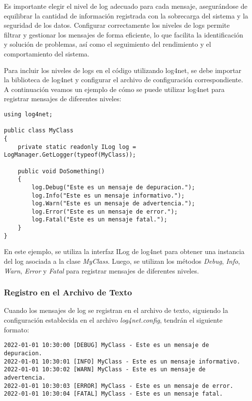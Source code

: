\documentclass[executivepaper]{article}
\begin{document}
Es importante elegir el nivel de log adecuado para cada mensaje, asegurándose de equilibrar la cantidad de información registrada con la sobrecarga del sistema y la seguridad de los datos. Configurar correctamente los niveles de logs permite filtrar y gestionar los mensajes de forma eficiente, lo que facilita la identificación y solución de problemas, así como el seguimiento del rendimiento y el comportamiento del sistema.

Para incluir los niveles de logs en el código utilizando log4net, se debe importar la biblioteca de log4net y configurar el archivo de configuración correspondiente. A continuación veamos un ejemplo de cómo se puede utilizar log4net para registrar mensajes de diferentes niveles:

\begin{lstlisting}
using log4net;

public class MyClass
{
    private static readonly ILog log = LogManager.GetLogger(typeof(MyClass));

    public void DoSomething()
    {
        log.Debug("Este es un mensaje de depuracion.");
        log.Info("Este es un mensaje informativo.");
        log.Warn("Este es un mensaje de advertencia.");
        log.Error("Este es un mensaje de error.");
        log.Fatal("Este es un mensaje fatal.");
    }
}
\end{lstlisting}

En este ejemplo, se utiliza la interfaz ILog de log4net para obtener una instancia del log asociada a la clase \emph{MyClass}. Luego, se utilizan los métodos \emph{Debug}, \emph{Info}, \emph{Warn}, \emph{Error} y \emph{Fatal} para registrar mensajes de diferentes niveles.

\subsubsection*{Registro en el Archivo de Texto}

Cuando los mensajes de log se registran en el archivo de texto, siguiendo la configuración establecida en el archivo \emph{log4net.config}, tendrán el siguiente formato:

\begin{verbatim}
2022-01-01 10:30:00 [DEBUG] MyClass - Este es un mensaje de depuracion.
2022-01-01 10:30:01 [INFO] MyClass - Este es un mensaje informativo.
2022-01-01 10:30:02 [WARN] MyClass - Este es un mensaje de advertencia.
2022-01-01 10:30:03 [ERROR] MyClass - Este es un mensaje de error.
2022-01-01 10:30:04 [FATAL] MyClass - Este es un mensaje fatal.
\end{verbatim}
\end{document}
